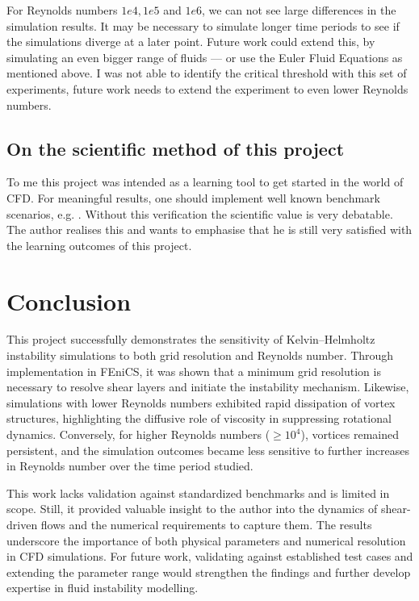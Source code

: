 \documentclass[a4paper,12pt]{article}
\begin{document}
For Reynolds numbers $1e4, 1e5$ and $1e6$, we can not see large differences in the simulation results.
It may be necessary to simulate longer time periods to see if the simulations diverge at a later point.
Future work could extend this, by simulating an even bigger range of fluids --- or use the Euler Fluid Equations as mentioned above.
I was not able to identify the critical threshold with this set of experiments, future work needs to extend the experiment to even lower Reynolds numbers.

\subsection{On the scientific method of this project}
To me this project was intended as a learning tool to get started in the world of \ac{CFD}.
For meaningful results, one should implement well known benchmark scenarios, e.g. \cite{Lehrenfeld2024}.
Without this verification the scientific value is very debatable.
The author realises this and wants to emphasise that he is still very satisfied with the learning outcomes of this project.

\section{Conclusion}
This project successfully demonstrates the sensitivity of Kelvin–Helmholtz instability simulations to both grid resolution and Reynolds number. Through implementation in FEniCS, it was shown that a minimum grid resolution is necessary to resolve shear layers and initiate the instability mechanism. Likewise, simulations with lower Reynolds numbers exhibited rapid dissipation of vortex structures, highlighting the diffusive role of viscosity in suppressing rotational dynamics. 
Conversely, for higher Reynolds numbers ($\geq 10^4$), vortices remained persistent, and the simulation outcomes became less sensitive to further increases in Reynolds number over the time period studied.

This work lacks validation against standardized benchmarks and is limited in scope. Still, it provided valuable insight to the author into the dynamics of shear-driven flows and the numerical requirements to capture them.
The results underscore the importance of both physical parameters and numerical resolution in \ac{CFD} simulations. For future work, validating against established test cases and extending the parameter range would strengthen the findings and further develop expertise in fluid instability modelling.
\end{document}
